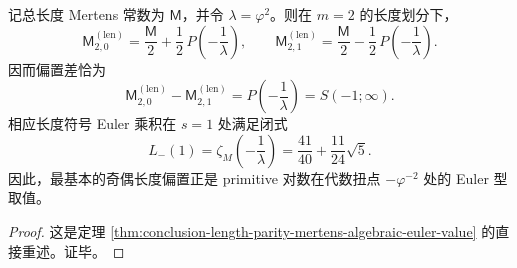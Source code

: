 \begin{corollary}\label{cor:conclusion-length-parity-algebraic-euler-torsion}
记总长度 Mertens 常数为 \(\mathsf M\)，并令 \(\lambda=\varphi^2\)。则在 \(m=2\) 的长度划分下，
\[
\mathsf M_{2,0}^{(\mathrm{len})}
=
\frac{\mathsf M}{2}
+
\frac12\,P\!\left(-\frac1\lambda\right),
\qquad
\mathsf M_{2,1}^{(\mathrm{len})}
=
\frac{\mathsf M}{2}
-
\frac12\,P\!\left(-\frac1\lambda\right).
\]
因而偏置差恰为
\[
\mathsf M_{2,0}^{(\mathrm{len})}
-
\mathsf M_{2,1}^{(\mathrm{len})}
=
P\!\left(-\frac1\lambda\right)
=
S(-1;\infty).
\]
相应长度符号 Euler 乘积在 \(s=1\) 处满足闭式
\[
L_-(1)
=
\zeta_M\!\left(-\frac1\lambda\right)
=
\frac{41}{40}+\frac{11}{24}\sqrt5.
\]
因此，最基本的奇偶长度偏置正是 primitive 对数在代数扭点 \(-\varphi^{-2}\) 处的 Euler 型取值。
\end{corollary}
\begin{proof}
这是定理 \ref{thm:conclusion-length-parity-mertens-algebraic-euler-value} 的直接重述。证毕。
\end{proof}

